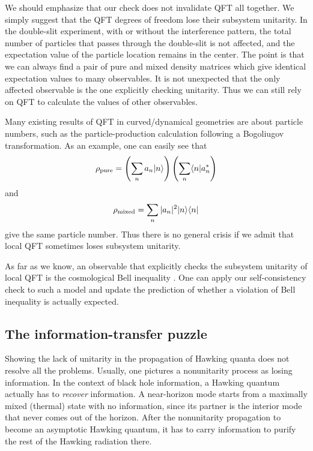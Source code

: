 \documentclass[aps,showpacs,twocolumn,floats,prd,superscriptaddress,nofootinbib]{revtex4-1}
\begin{document}
We should emphasize that our check does not invalidate QFT all together.
We simply suggest that the QFT degrees of freedom lose their subsystem unitarity.
In the double-slit experiment, with or without the interference pattern, the total number of particles that passes through the double-slit is not affected, and the expectation value of the particle location remains in the center.
The point is that we can always find a pair of pure and mixed density matrices which give identical expectation values to many observables.
It is not unexpected that the only affected observable is the one explicitly checking unitarity.
Thus we can still rely on QFT to calculate the values of other observables.

Many existing results of QFT in curved/dynamical geometries are about particle numbers, such as the particle-production calculation following a Bogoliugov transformation. 
As an example, one can easily see that
\begin{equation}
\rho_{\rm pure} = \left(\sum_n a_n|n\rangle\right)
\left(\sum_n \langle n| a_n^*\right)
\end{equation}
and
\begin{equation}
\rho_{\rm mixed} = \sum_n |a_n|^2 |n\rangle\langle n|
\end{equation}
give the same particle number. 
Thus there is no general crisis if we admit that local QFT sometimes loses subsystem unitarity. 

As far as we know, an observable that explicitly checks the subsystem unitarity of local QFT is the cosmological Bell inequality \cite{Mal15}. 
One can apply our self-consistency check to such a model and update the prediction of whether a violation of Bell inequality is actually expected.


\subsection{The information-transfer puzzle}

Showing the lack of unitarity in the propagation of Hawking quanta does not resolve all the problems. 
Usually, one pictures a nonunitarity process as losing information. 
In the context of black hole information, a Hawking quantum actually has to {\it recover} information. 
A near-horizon mode starts from a maximally mixed (thermal) state with no information, since its partner is the interior mode that never comes out of the horizon. 
After the nonunitarity propagation to become an asymptotic Hawking quantum, it has to carry information to purify the rest of the Hawking radiation there.
\end{document}
